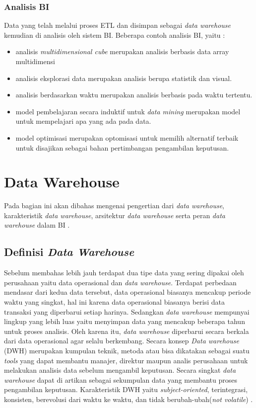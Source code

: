 \subsubsection{Analisis BI}
Data yang telah melalui proses ETL dan disimpan sebagai \textit{data warehouse} kemudian di analisis oleh sistem BI. Beberapa contoh analisis BI, yaitu :
\begin{itemize}
	\item analisis \textit{multidimensional cube} merupakan analisis berbasis data array multidimensi
	\item analisis eksplorasi data merupakan analisis berupa statistik dan visual.
	\item analisis berdasarkan waktu merupakan analisis berbasis pada waktu tertentu.
	\item model pembelajaran secara induktif untuk \textit{data mining} merupakan model untuk mempelajari apa yang ada pada data.
	\item model optimisasi merupakan optomisasi untuk memilih alternatif terbaik untuk disajikan sebagai bahan pertimbangan pengambilan keputusan.
\end{itemize} 

\section{Data Warehouse}
Pada bagian ini akan dibahas mengenai pengertian dari \textit{data warehouse}, karakteristik \textit{data warehouse}, arsitektur \textit{data warehouse} serta peran \textit{data warehouse} dalam BI .

\subsection{Definisi \textit{Data Warehouse}}
Sebelum membahas lebih jauh terdapat dua tipe data yang sering dipakai oleh perusahaan yaitu data operasional dan \textit{data warehouse}. Terdapat perbedaan mendasar dari kedua data tersebut, data operasional biasanya mencakup periode waktu yang singkat, hal ini karena data operasional biasanya berisi data transaksi yang diperbarui setiap harinya. Sedangkan \textit{data warehouse} mempunyai lingkup yang lebih luas yaitu menyimpan data yang mencakup beberapa tahun untuk proses analisis. Oleh karena itu, \textit{data warehouse} diperbarui secara berkala dari data operasional agar selalu berkembang. Secara konsep \textit{Data warehouse} (DWH)   merupakan kumpulan teknik, metoda atau bisa dikatakan sebagai suatu \textit{tools} yang dapat membantu manajer, direktur maupun analis perusahaan untuk melakukan analisis data sebelum mengambil keputusan. Secara singkat \textit{data warehouse} dapat di artikan sebagai sekumpulan data yang membantu proses pengambilan keputusan. Karakteristik DWH yaitu \textit{subject-oriented}, terintegrasi, konsisten, berevolusi dari waktu ke waktu, dan tidak berubah-ubah(\textit{not volatile}) \cite{Matteo:2009}.  

